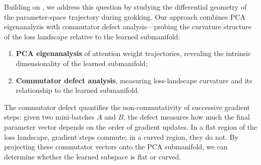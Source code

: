 \documentclass[11pt]{article}
\begin{document}
Building on \citet{xu2026lowdim}, we address this question by studying the differential geometry of the parameter-space trajectory during grokking.
Our approach combines PCA eigenanalysis with commutator defect analysis---probing the curvature structure of the loss landscape relative to the learned submanifold:
\begin{enumerate}
    \item \textbf{PCA eigenanalysis} of attention weight trajectories, revealing the intrinsic dimensionality of the learned submanifold;
    \item \textbf{Commutator defect analysis}, measuring loss-landscape curvature and its relationship to the learned submanifold.
\end{enumerate}

The commutator defect quantifies the non-commutativity of successive gradient steps: given two mini-batches $A$ and $B$, the defect measures how much the final parameter vector depends on the order of gradient updates.
In a flat region of the loss landscape, gradient steps commute; in a curved region, they do not.
By projecting these commutator vectors onto the PCA submanifold, we can determine whether the learned subspace is flat or curved.
\end{document}
